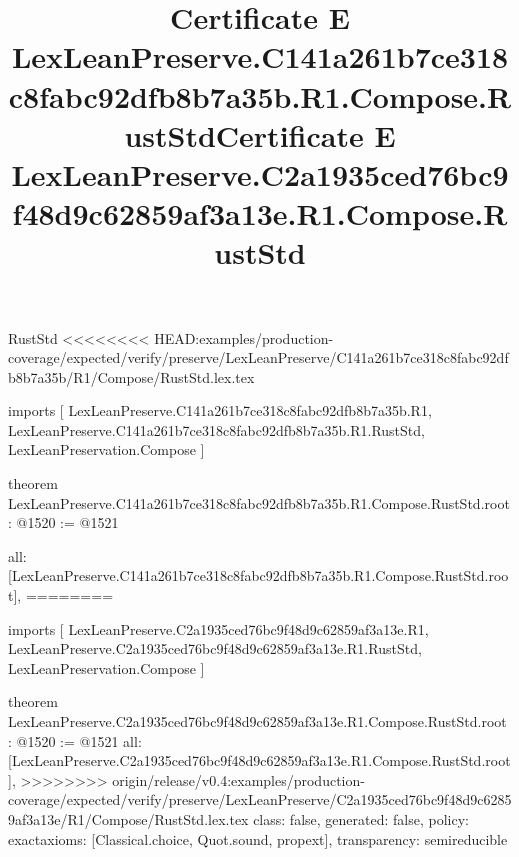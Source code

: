 \begin{lexlean}{RustStd}
<<<<<<<< HEAD:examples/production-coverage/expected/verify/preserve/LexLeanPreserve/C141a261b7ce318c8fabc92dfb8b7a35b/R1/Compose/RustStd.lex.tex
\title{Certificate E LexLeanPreserve.C141a261b7ce318c8fabc92dfb8b7a35b.R1.Compose.RustStd}
\begin{coremodule}
imports [
  LexLeanPreserve.C141a261b7ce318c8fabc92dfb8b7a35b.R1,
  LexLeanPreserve.C141a261b7ce318c8fabc92dfb8b7a35b.R1.RustStd,
  LexLeanPreservation.Compose
]

theorem LexLeanPreserve.C141a261b7ce318c8fabc92dfb8b7a35b.R1.Compose.RustStd.root : @1520 := @1521 {
  all: [LexLeanPreserve.C141a261b7ce318c8fabc92dfb8b7a35b.R1.Compose.RustStd.root],
========
\title{Certificate E LexLeanPreserve.C2a1935ced76bc9f48d9c62859af3a13e.R1.Compose.RustStd}
\begin{coremodule}
imports [
  LexLeanPreserve.C2a1935ced76bc9f48d9c62859af3a13e.R1,
  LexLeanPreserve.C2a1935ced76bc9f48d9c62859af3a13e.R1.RustStd,
  LexLeanPreservation.Compose
]

theorem LexLeanPreserve.C2a1935ced76bc9f48d9c62859af3a13e.R1.Compose.RustStd.root : @1520 := @1521 {
  all: [LexLeanPreserve.C2a1935ced76bc9f48d9c62859af3a13e.R1.Compose.RustStd.root],
>>>>>>>> origin/release/v0.4:examples/production-coverage/expected/verify/preserve/LexLeanPreserve/C2a1935ced76bc9f48d9c62859af3a13e/R1/Compose/RustStd.lex.tex
  class: false,
  generated: false,
  policy: exact{axioms: [Classical.choice, Quot.sound, propext]},
  transparency: semireducible
}


\end{coremodule}}
\end{coremodule}
\end{lexlean}
